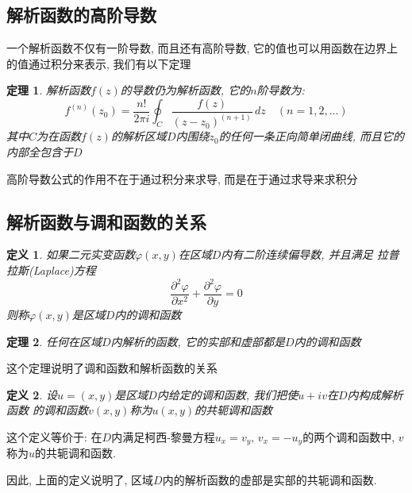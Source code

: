 \documentclass[12pt, a4paper, oneside]{ctexart}
\theoremstyle{plain}
\newtheorem{theorem}{定理}[section]
\newtheorem{definition}{定义}[section]
\theoremstyle{definition}
\theoremstyle{definition}
\begin{document}
\subsection{解析函数的高阶导数}
一个解析函数不仅有一阶导数, 而且还有高阶导数, 它的值也可以用函数在边界上的值通过积分来表示, 我们有以下定理
\begin{theorem}
    解析函数$f(z)$的导数仍为解析函数, 它的$n$阶导数为:
    \[
        f^{(n)}(z_0)=\frac{n!}{2\pi i}\oint_{C}\frac{f(z)}{(z-z_0)^{(n+1)}}\,dz \quad (n=1,2,...)
    \]
    其中$C$为在函数$f(z)$的解析区域$D$内围绕$z_0$的任何一条正向简单闭曲线, 而且它的内部全包含于$D$
\end{theorem}
高阶导数公式的作用不在于通过积分来求导, 而是在于通过求导来求积分

\subsection{解析函数与调和函数的关系}
\begin{definition}
    如果二元实变函数$\varphi(x,y)$在区域$D$内有二阶连续偏导数, 并且满足
    拉普拉斯(Laplace)方程
    \[
    \frac{\partial^2\varphi}{\partial x^2}+\frac{\partial^2\varphi}{\partial y}=0
    \]
    则称$\varphi(x,y)$是区域$D$内的调和函数
\end{definition}
\begin{theorem}
    任何在区域$D$内解析的函数, 它的实部和虚部都是$D$内的调和函数
\end{theorem}
这个定理说明了调和函数和解析函数的关系
\begin{definition}
    设$u=(x,y)$是区域$D$内给定的调和函数, 我们把使$u+iv$在$D$内构成解析函数
    的调和函数$v(x,y)$称为$u(x,y)$的共轭调和函数
\end{definition}
这个定义等价于: 在$D$内满足柯西-黎曼方程$u_x=v_y,\,v_x=-u_y$的两个调和函数中, 
$v$称为$u$的共轭调和函数.

因此, 上面的定义说明了, 区域$D$内的解析函数的虚部是实部的共轭调和函数.
\end{document}
